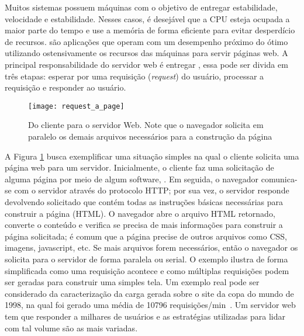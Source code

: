  Muitos sistemas possuem máquinas  com o objetivo de
entregar estabilidade, velocidade e estabilidade. Nesses casos, é desejável que
a CPU esteja ocupada a maior parte do tempo e use a memória de forma eficiente
para evitar desperdício de recursos.  são aplicações que operam com um desempenho próximo
do ótimo utilizando ostensivamente os recursos das máquinas para servir páginas
web. A principal responsabilidade do servidor web é entregar , essa pode ser divida em três etapas: esperar por uma requisição
(\textit{request}) do usuário, processar a requisição e responder ao usuário.

\begin{figure}[!h]
  \centering
  \texttt{[image: request\_a\_page]}
  \caption[Do cliente para o servidor Web.]{Do cliente para o servidor Web. Note que o navegador solicita em paralelo os demais arquivos necessários para a construção da página}
  \label{fig:client_to_web_server}
\end{figure}

A Figura \ref{fig:client_to_web_server} busca exemplificar uma situação simples
na qual o cliente solicita uma página web para um servidor. Inicialmente, o
cliente faz uma solicitação de alguma página por meio de algum software, . Em seguida, o navegador comunica-se com o
servidor através do protocolo HTTP; por sua vez, o servidor responde devolvendo
 solicitado que contém todas as instruções básicas necessárias para
construir a página (HTML). O navegador abre o arquivo HTML retornado, converte
o conteúdo e verifica se precisa de mais informações para construir a página
solicitada; é comum que a página precise de outros arquivos como CSS, imagens,
javascript, etc. Se mais arquivos forem necessários, então o navegador os solicita
para o servidor de forma paralela ou serial. O exemplo ilustra de
forma simplificada como uma requisição acontece e como múltiplas requisições
podem ser geradas para construir uma simples tela. Um exemplo real pode ser
considerado da caracterização da carga gerada sobre o site da copa do mundo de
1998, na qual foi gerado uma média de 10796 requisições/min~\citep{worldcup}.
Um servidor web tem que responder a milhares de usuários e as estratégias utilizadas
para lidar com tal volume são as mais variadas.

